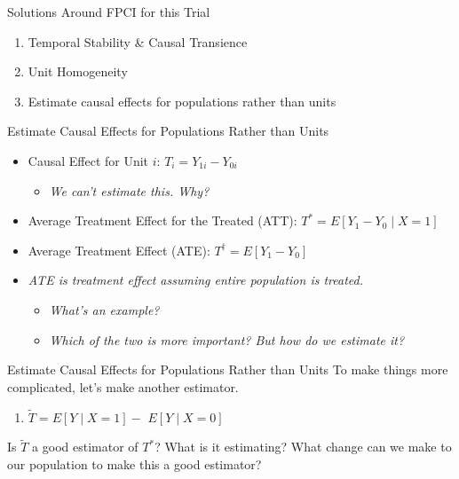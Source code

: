 \documentclass{beamer}
\begin{document}
\begin{frame}{Solutions Around FPCI for this Trial}
  \begin{enumerate}
    \item Temporal Stability \& Causal Transience {\color{red}{X}}
    \item Unit Homogeneity {\color{red}{X}}
    \item Estimate causal effects for populations rather than units {\color{green}{\checkmark}}
  \end{enumerate}
\end{frame}

\begin{frame}{Estimate Causal Effects for Populations Rather than Units}
  \begin{itemize}
    \item<+-> Causal Effect for Unit $i$: $T_i=Y_{1 i}-Y_{0 i}$
    \begin{itemize}
      \item \textit{We can't estimate this. Why?}
    \end{itemize}
    \item<+-> Average Treatment Effect for the Treated (ATT): $T^*=E\left[Y_1-Y_0 \mid X=1\right]$
    \item<+-> Average Treatment Effect (ATE): $T^{\dagger}=E\left[Y_1-Y_0\right]$
    \item<+-> \textit{ATE is treatment effect assuming entire population is treated.}
      \begin{itemize}
        \item \textit{What's an example?}
        \item \textit{Which of the two is more important? But how do we estimate it?}
      \end{itemize}
  \end{itemize}
\end{frame}


\begin{frame}{Estimate Causal Effects for Populations Rather than Units}
  To make things more complicated, let's make another estimator.
  \begin{enumerate}
    \item<+-> $\tilde{T}=E[Y \mid X=1]-$ $E[Y \mid X=0]$
  \end{enumerate}
  Is $\tilde{T}$ a good estimator of $T^*$? What is it estimating?
  What change can we make to our population to make this a good estimator?
\end{frame}
\end{document}
